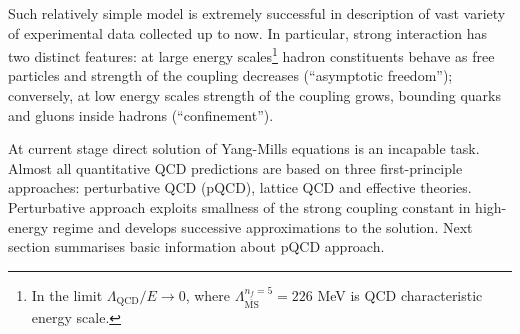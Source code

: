 Such relatively simple model is extremely successful in description of vast variety of experimental data collected up to now. In particular, strong interaction has two distinct features: at large energy scales\footnote{In the limit $\Lambda_\mathrm{QCD}/E\rightarrow 0$, where $\Lambda^{n_f=5}_{\overline{\mathrm{MS}}}=226$ MeV is QCD characteristic energy scale.} hadron constituents behave as free particles and strength of the coupling decreases (``asymptotic freedom''); conversely, at low energy scales strength of the coupling grows, bounding quarks and gluons inside hadrons (``confinement'').  
 
At current stage direct solution of Yang-Mills equations is an incapable task. Almost all quantitative QCD predictions are based on three first-principle approaches: perturbative QCD (pQCD), lattice QCD and effective theories. Perturbative approach exploits smallness of the strong coupling constant in high-energy regime and develops successive approximations to the solution. Next section summarises basic information about pQCD approach.

